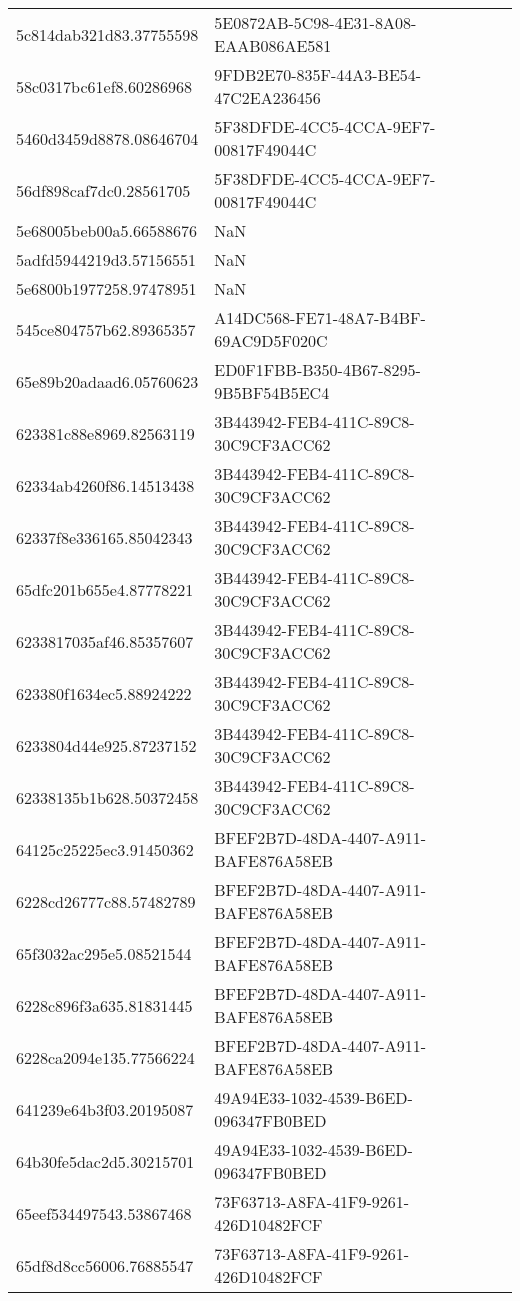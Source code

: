 \begin{tabular}{ll}
5c814dab321d83.37755598 & 5E0872AB-5C98-4E31-8A08-EAAB086AE581 \\
58c0317bc61ef8.60286968 & 9FDB2E70-835F-44A3-BE54-47C2EA236456 \\
5460d3459d8878.08646704 & 5F38DFDE-4CC5-4CCA-9EF7-00817F49044C \\
56df898caf7dc0.28561705 & 5F38DFDE-4CC5-4CCA-9EF7-00817F49044C \\
5e68005beb00a5.66588676 & NaN \\
5adfd5944219d3.57156551 & NaN \\
5e6800b1977258.97478951 & NaN \\
545ce804757b62.89365357 & A14DC568-FE71-48A7-B4BF-69AC9D5F020C \\
65e89b20adaad6.05760623 & ED0F1FBB-B350-4B67-8295-9B5BF54B5EC4 \\
623381c88e8969.82563119 & 3B443942-FEB4-411C-89C8-30C9CF3ACC62 \\
62334ab4260f86.14513438 & 3B443942-FEB4-411C-89C8-30C9CF3ACC62 \\
62337f8e336165.85042343 & 3B443942-FEB4-411C-89C8-30C9CF3ACC62 \\
65dfc201b655e4.87778221 & 3B443942-FEB4-411C-89C8-30C9CF3ACC62 \\
6233817035af46.85357607 & 3B443942-FEB4-411C-89C8-30C9CF3ACC62 \\
623380f1634ec5.88924222 & 3B443942-FEB4-411C-89C8-30C9CF3ACC62 \\
6233804d44e925.87237152 & 3B443942-FEB4-411C-89C8-30C9CF3ACC62 \\
62338135b1b628.50372458 & 3B443942-FEB4-411C-89C8-30C9CF3ACC62 \\
64125c25225ec3.91450362 & BFEF2B7D-48DA-4407-A911-BAFE876A58EB \\
6228cd26777c88.57482789 & BFEF2B7D-48DA-4407-A911-BAFE876A58EB \\
65f3032ac295e5.08521544 & BFEF2B7D-48DA-4407-A911-BAFE876A58EB \\
6228c896f3a635.81831445 & BFEF2B7D-48DA-4407-A911-BAFE876A58EB \\
6228ca2094e135.77566224 & BFEF2B7D-48DA-4407-A911-BAFE876A58EB \\
641239e64b3f03.20195087 & 49A94E33-1032-4539-B6ED-096347FB0BED \\
64b30fe5dac2d5.30215701 & 49A94E33-1032-4539-B6ED-096347FB0BED \\
65eef534497543.53867468 & 73F63713-A8FA-41F9-9261-426D10482FCF \\
65df8d8cc56006.76885547 & 73F63713-A8FA-41F9-9261-426D10482FCF \\

\end{tabular}
